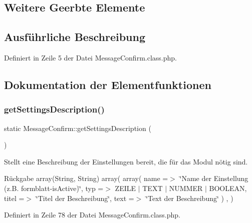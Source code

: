 \subsection*{Weitere Geerbte Elemente}


\subsection{Ausführliche Beschreibung}


Definiert in Zeile 5 der Datei Message\+Confirm.\+class.\+php.



\subsection{Dokumentation der Elementfunktionen}
\mbox{\label{class_message_confirm_a9f5b5365855d0d6fec570fd7e5e03bfc}} 
\subsubsection{\texorpdfstring{get\+Settings\+Description()}{getSettingsDescription()}}
{\footnotesize\ttfamily static Message\+Confirm\+::get\+Settings\+Description (\begin{DoxyParamCaption}{ }\end{DoxyParamCaption})\hspace{0.3cm}{\ttfamily [static]}}

Stellt eine Beschreibung der Einstellungen bereit, die für das Modul nötig sind. \begin{DoxyReturn}{Rückgabe}
array(\+String, String) array( array( \textquotesingle{}name\textquotesingle{} =$>$ \char`\"{}\+Name der Einstellung (z.\+B. formblatt-\/is\+Active)\char`\"{}, \textquotesingle{}typ\textquotesingle{} =$>$ Z\+E\+I\+LE $\vert$ T\+E\+XT $\vert$ N\+U\+M\+M\+ER $\vert$ B\+O\+O\+L\+E\+AN, \textquotesingle{}titel\textquotesingle{} =$>$ \char`\"{}\+Titel der Beschreibung\char`\"{}, \textquotesingle{}text\textquotesingle{} =$>$ \char`\"{}\+Text der Beschreibung\char`\"{} ) , ) 
\end{DoxyReturn}


Definiert in Zeile 78 der Datei Message\+Confirm.\+class.\+php.

\mbox{\label{class_message_confirm_a3db19c53b0fc9883eec64167f636ad13}} 
